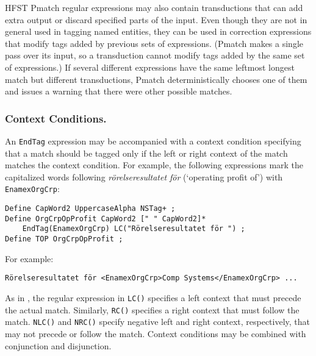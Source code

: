 \documentclass{llncs}
\begin{document}
HFST Pmatch regular expressions may also contain transductions that can add
extra output or discard specified parts of the input. Even though they
are not in general used in tagging named entities, they can be
used in correction expressions that modify tags added by previous sets
of expressions. (Pmatch makes a single pass over its input, so a
transduction cannot modify tags added by the same set of expressions.)
If several different expressions have the same leftmost longest match
but different transductions, Pmatch deterministically chooses one of
them and issues a warning that there were other possible matches.

\subsubsection{Context Conditions.}

An \texttt{EndTag} expression may be accompanied with a context
condition specifying that a match should be tagged only if the
left or right context of the match matches the context condition. For
example, the
following expressions mark the capitalized words following
\textit{rörelseresultatet för} (`operating profit of') with
\texttt{EnamexOrgCrp}:

\begin{verbatim}
Define CapWord2 UppercaseAlpha NSTag+ ;
Define OrgCrpOpProfit CapWord2 [" " CapWord2]*
    EndTag(EnamexOrgCrp) LC("Rörelseresultatet för ") ;
Define TOP OrgCrpOpProfit ;
\end{verbatim}

\noindent
For example:
\begin{verbatim}
Rörelseresultatet för <EnamexOrgCrp>Comp Systems</EnamexOrgCrp> ...
\end{verbatim}

As in \cite{karttunen/2011}, the regular expression in \texttt{LC()}
specifies a left context that must precede the actual match.
Similarly, \texttt{RC()}
specifies a right context that must follow the match. \texttt{NLC()}
and \texttt{NRC()} specify negative left and right context,
respectively, that may not precede or follow the match.
Context conditions may be combined with conjunction and disjunction.


\end{document}
